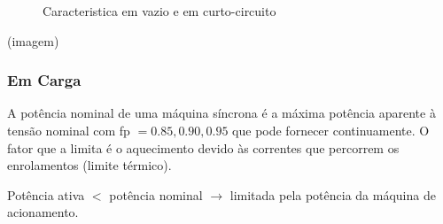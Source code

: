 \begin{minipage}[c]{.5\linewidth}
\begin{figure}[H]
{
    }
    \caption{Caracteristica em vazio e em curto-circuito}
    \label{fig:maq-sincrona-vazio-e-cc}
\end{figure}
\end{minipage}\hfill
\begin{minipage}[c]{.45\linewidth}
    \begin{mdframed}
        \vspace{2.25cm}
        \hfil (imagem)
        \vspace{2.25cm}
    \end{mdframed}
\end{minipage}

\clearpage
\subsubsection{Em Carga}

\noindent A potência nominal de uma máquina síncrona  é a máxima potência aparente à tensão nominal com fp $= 0.85,0.90, 0.95$ que pode fornecer continuamente. O fator que a limita é o aquecimento devido às correntes que percorrem os enrolamentos (limite térmico).

\begin{mdframed}
    \hfil Potência ativa $<$ potência nominal $\rightarrow$ limitada pela potência da máquina de acionamento.
\end{mdframed}

